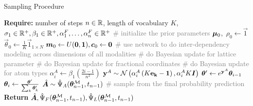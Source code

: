 \begin{algorithm}[h]
\small
\caption{Sampling Procedure}\label{alg:sampling}
\begin{algorithmic}
\STATE \textbf{Require:} number of steps $n\in\R$, length of vocabulary $K$, $\sigma_1\in\R^{+},\beta_1\in\R^{+},\alpha_1^F,\dots,\alpha_n^F\in\R^{+}$
\STATE \textcolor{gray}{\# initialize the prior parameters }
\STATE $\vmu_0$,~$\rho_0\gets \vec{1}$
\STATE $\vec{\theta}_0\gets\frac{1}{K}\vec{1}_{1\times N}$
\STATE $\vm_0\gets U(\vec{0},\vec{1}),\vc_0\gets \vec{0}$
    \STATE \textcolor{gray}{\# use network to do inter-dependency modeling across dimensions of all modalities }
    \STATE \textcolor{gray}{\# do Bayesian update for lattice parameter }    
    \STATE \textcolor{gray}{\# do Bayesian update for fractional coordinates }   
    \STATE \textcolor{gray}{\# do Bayesian update for atom types }   
    \STATE $\alpha_i^A \leftarrow \beta_1\left(\frac{2i -1}{n^2}\right)$
    \STATE $\y^A \sim \N{\alpha_i^A\left(K\oh{\k}{KD}-
    \vec{1}\right)}{\alpha_i^A K\vI}$
    \STATE $\parsn' \gets e^{\y^A} \parsn_{i-1}$
    \STATE $\parsn_i \gets \frac{\parsn'}{\sum_k \parsn'_k}$
    \ENDIF
\ENDFOR
\STATE $\hat{\vec{A}}\sim \predA{n-1}$ \textcolor{gray}{\# sample from the final probability prediction}   
\STATE \textbf{Return} $\hat{\vec{A}},\predF{n-1},\predL{n-1}$
\end{algorithmic}
\end{algorithm}
